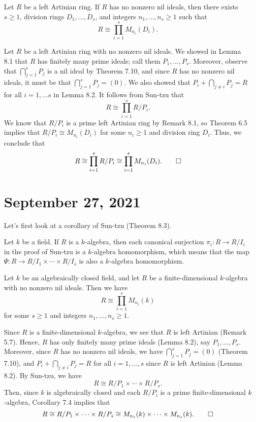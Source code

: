 \begin{theo}{}
Let $R$ be a left Artinian ring. If $R$ has no nonzero nil ideals, then there exists $s \geq 1$, 
division rings $D_1, \dots, D_s$, and integers $n_1, \dots, n_s \geq 1$ such that 
\[ R \cong \prod_{i=1}^s M_{n_i}(D_i). \]
\end{theo}
\begin{pf}
Let $R$ be a left Artinian ring with no nonzero nil ideals. We showed in Lemma 8.1 that $R$ 
has finitely many prime ideals; call them $P_1, \dots, P_s$. Moreover, observe that $\bigcap_{j=1}^s P_j$ is a nil ideal by Theorem 7.10, and since $R$ has no nonzero nil ideals, it must be that 
$\bigcap_{j=1}^s P_j = (0)$. We also showed that $P_i + \bigcap_{j\neq i} P_j = R$ for all 
$i = 1, \dots s$ in Lemma 8.2. It follows from Sun-tzu that 
\[ R \cong \prod_{i=1}^s R/P_i. \] 
We know that $R/P_i$ is a prime left Artinian ring by Remark 8.1, so Theorem 6.5 implies that 
$R/P_i \cong M_{n_i}(D_i)$ for some $n_i \geq 1$ and division ring $D_i$. Thus, we conclude that 
\[ R \cong \prod_{i=1}^s R/P_i \cong \prod_{i=1}^s M_{n_i}(D_i). \qedhere \]
\end{pf}

\section{September 27, 2021}

Let's first look at a corollary of Sun-tzu (Theorem 8.3).

\begin{remark}{}
Let $k$ be a field. If $R$ is a $k$-algebra, then each canonical surjection $\pi_i : R \to R/I_i$ 
in the proof of Sun-tzu is a $k$-algebra homomorphism, which means that the map
$\Psi : R \to R/I_1 \times \cdots \times R/I_s$ is also a $k$-algebra homomorphism. 
\end{remark}

\begin{cor}{}
Let $k$ be an algebraically closed field, and let $R$ be a finite-dimensional $k$-algebra with no nonzero
nil ideals. Then we have 
\[ R \cong \prod_{i=1}^s M_{n_i}(k) \]
for some $s \geq 1$ and integers $n_1, \dots, n_s \geq 1$. 
\end{cor}
\begin{pf}
Since $R$ is a finite-dimensional $k$-algebra, we see that $R$ is left Artinian (Remark 5.7).
Hence, $R$ has only finitely many prime ideals (Lemma 8.2), say $P_1, \dots, P_s$. Moreover, 
since $R$ has no nonzero nil ideals, we have $\bigcap_{j=1}^s P_j = (0)$ (Theorem 7.10), and 
$P_i + \bigcap_{j\neq i} P_j = R$ for all $i = 1, \dots, s$ since $R$ is left Artinian (Lemma 8.2). 
By Sun-tzu, we have 
\[ R \cong R/P_1 \times \cdots \times R/P_s. \]
Then, since $k$ is algebraically closed and each $R/P_i$ is a prime finite-dimensional $k$-algebra, 
Corollary 7.4 implies that 
\[ R \cong R/P_1 \times \cdots \times R/P_s \cong M_{n_1}(k) \times \cdots \times M_{n_s}(k). 
\qedhere \]
\end{pf}


